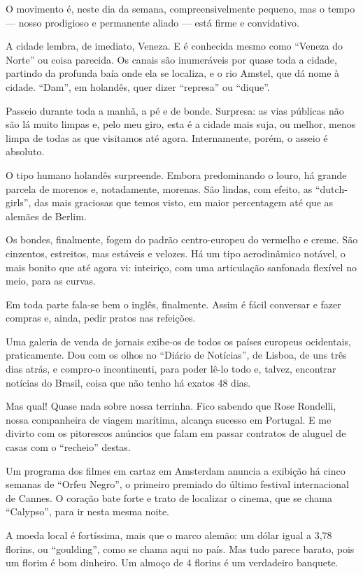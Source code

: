 O movimento é, neste dia da semana, compreensivelmente pequeno, mas o tempo --- nosso prodigioso e permanente aliado --- está firme e convidativo.

A cidade lembra, de imediato, Veneza. E é conhecida mesmo como ``Veneza do Norte'' ou coisa parecida. Os canais são inumeráveis por quase toda a cidade, partindo da profunda baía onde ela se localiza, e o rio Amstel, que dá nome à cidade. ``Dam'', em holandês, quer dizer ``represa'' ou ``dique''.

Passeio durante toda a manhã, a pé e de bonde. Surpresa: as vias públicas não são lá muito limpas e, pelo meu giro, esta é a cidade mais suja, ou melhor, menos limpa de todas as que visitamos até agora. Internamente, porém, o asseio é absoluto.

O tipo humano holandês surpreende. Embora predominando o louro, há grande parcela de morenos e, notadamente, morenas. São lindas, com efeito, as ``dutch-girls'', das mais graciosas que temos visto, em maior percentagem até que as alemães de Berlim.

Os bondes, finalmente, fogem do padrão centro-europeu do vermelho e creme. São cinzentos, estreitos, mas estáveis e velozes. Há um tipo aerodinâmico notável, o mais bonito que até agora vi: inteiriço, com uma articulação sanfonada flexível no meio, para as curvas.

Em toda parte fala-se bem o inglês, finalmente. Assim é fácil conversar e fazer compras e, ainda, pedir pratos nas refeições.

Uma galeria de venda de jornais exibe-os de todos os países europeus ocidentais, praticamente. Dou com os olhos no ``Diário de Notícias'', de Lisboa, de uns três dias atrás, e compro-o incontinenti, para poder lê-lo todo e, talvez, encontrar notícias do Brasil, coisa que não tenho há exatos 48 dias.

Mas qual! Quase nada sobre nossa terrinha. Fico sabendo que Rose Rondelli, nossa companheira de viagem marítima, alcança sucesso em Portugal. E me divirto com os pitorescos anúncios que falam em passar contratos de aluguel de casas com o ``recheio'' destas.

Um programa dos filmes em cartaz em Amsterdam anuncia a exibição há cinco semanas de ``Orfeu Negro'', o primeiro premiado do último festival internacional de Cannes. O coração bate forte e trato de localizar o cinema, que se chama ``Calypso'', para ir nesta mesma noite.

A moeda local é fortíssima, mais que o marco alemão: um dólar igual a 3,78 florins, ou ``goulding'', como se chama aqui no país. Mas tudo parece barato, pois um florim é bom dinheiro. Um almoço de 4 florins é um verdadeiro banquete.

